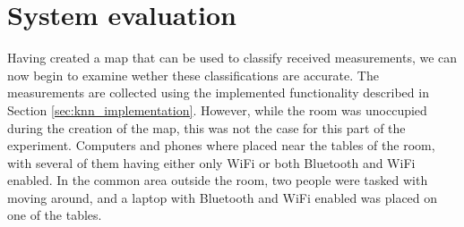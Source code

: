 \section{System evaluation}\label{sec:experiment_results}
Having created a map that can be used to classify received measurements, we can now begin to examine wether these classifications are accurate. 
The measurements are collected using the implemented functionality described in Section \ref{sec:knn_implementation}.
However, while the room was unoccupied during the creation of the map, this was not the case for this part of the experiment. 
Computers and phones where placed near the tables of the room, with several of them having either only WiFi or both Bluetooth and WiFi enabled. 
In the common area outside the room, two people were tasked with moving around, and a laptop with Bluetooth and WiFi enabled was placed on one of the tables.

\begin{table}[H]
    \caption{Evaluation results from Samsung Galaxy A53 showing the number of correct classifications out of a possible ten for each k-value}
    \label{lst:resultsPhone}
\end{table}

